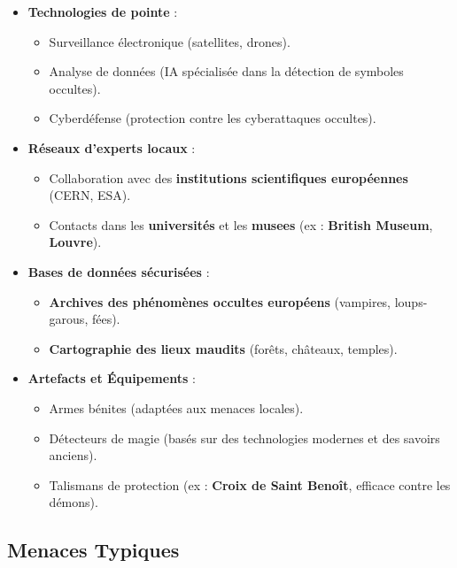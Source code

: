 \documentclass[10pt,a5paper,twoside]{book}
\begin{document}
\begin{itemize}
	\item \textbf{Technologies de pointe} :
	\begin{itemize}
		\item Surveillance électronique (satellites, drones).
		\item Analyse de données (IA spécialisée dans la détection de symboles occultes).
		\item Cyberdéfense (protection contre les cyberattaques occultes).
	\end{itemize}
	\item \textbf{Réseaux d'experts locaux} :
	\begin{itemize}
		\item Collaboration avec des \textbf{institutions scientifiques européennes} (CERN, ESA).
		\item Contacts dans les \textbf{universités} et les \textbf{musees} (ex : \textbf{British Museum}, \textbf{Louvre}).
	\end{itemize}
	\item \textbf{Bases de données sécurisées} :
	\begin{itemize}
		\item \textbf{Archives des phénomènes occultes européens} (vampires, loups-garous, fées).
		\item \textbf{Cartographie des lieux maudits} (forêts, châteaux, temples).
	\end{itemize}
	\item \textbf{Artefacts et Équipements} :
	\begin{itemize}
		\item Armes bénites (adaptées aux menaces locales).
		\item Détecteurs de magie (basés sur des technologies modernes et des savoirs anciens).
		\item Talismans de protection (ex : \textbf{Croix de Saint Benoît}, efficace contre les démons).
	\end{itemize}
\end{itemize}

\newpage

\subsection{Menaces Typiques}
\end{document}
